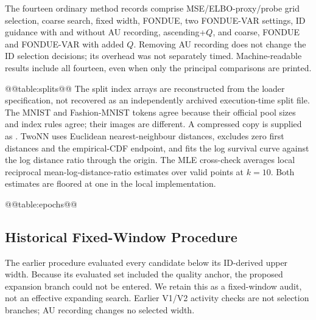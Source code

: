 The fourteen ordinary method records comprise MSE/ELBO-proxy/probe grid
selection, coarse search, fixed width, FONDUE, two FONDUE-VAR settings,
ID guidance with and without AU recording, ascending+$Q$, and coarse,
FONDUE and FONDUE-VAR with added $Q$. Removing AU recording does not
change the ID selection decisions; its overhead was not separately
timed. Machine-readable results include all fourteen, even when only
the principal comparisons are printed.

@@table:splits@@
The split index arrays are reconstructed from the loader specification,
not recovered as an independently archived execution-time split file.
The MNIST and Fashion-MNIST tokens agree because their official pool
sizes and index rules agree; their images are different. A compressed
copy is supplied as .
TwoNN uses Euclidean nearest-neighbour distances, excludes zero first
distances and the empirical-CDF endpoint, and fits the log survival
curve against the log distance ratio through the origin. The MLE
cross-check averages local reciprocal mean-log-distance-ratio estimates
over valid points at $k=10$. Both estimates are floored at one in the
local implementation.

@@table:epochs@@

\subsection{Historical Fixed-Window Procedure}\label{app:legacy}
The earlier procedure evaluated every candidate below its ID-derived
upper width. Because its evaluated set included the quality anchor,
the proposed expansion branch could not be entered. We retain this as
a fixed-window audit, not an effective expanding search. Earlier V1/V2
activity checks are not selection branches; AU recording changes no
selected width.

